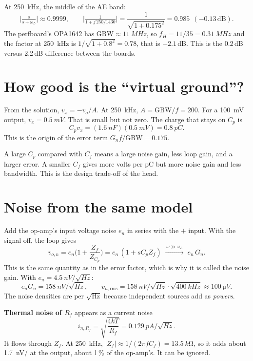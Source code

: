 \documentclass[11pt,a4paper]{article}
\begin{document}
At \SI{250}{kHz}, the middle of the AE band:
\[
\Big|\tfrac{s}{s+\omega_L}\Big|\approx 0.9999,\qquad
\Big|\tfrac{1}{1+j\,250/1430}\Big|=\frac{1}{\sqrt{1+0.175^2}}=0.985\ \ (-0.13\,\mathrm{dB}).
\]
The perfboard's OPA1642 has $\mathrm{GBW}\approx\SI{11}{MHz}$, so $f_H=11/35=\SI{0.31}{MHz}$ and the factor at \SI{250}{kHz} is $1/\sqrt{1+0.8^2}=0.78$, that is $-2.1$\,dB. This is the 0.2\,dB versus 2.2\,dB difference between the boards.

\section{How good is the ``virtual ground''?}

From the solution, $v_x=-v_o/A$. At \SI{250}{kHz}, $A=\mathrm{GBW}/f=200$. For a \SI{100}{mV} output, $v_x=\SI{0.5}{mV}$. That is small but not zero. The charge that stays on $C_p$ is
\[
C_p v_x=(\SI{1.6}{nF})(\SI{0.5}{mV})=\SI{0.8}{pC}.
\]
This is the origin of the error term $G_n f/\mathrm{GBW}=0.175$.

\begin{key}
A large $C_p$ compared with $C_f$ means a large noise gain, less loop gain, and a larger error. A smaller $C_f$ gives more volts per pC but more noise gain and less bandwidth. This is the design trade-off of the head.
\end{key}

\section{Noise from the same model}

Add the op-amp's input voltage noise $e_n$ in series with the $+$ input. With the signal off, the loop gives
\[
v_{o,n}=e_n\Big(1+\frac{Z_f}{Z_{C_p}}\Big)=e_n\,(1+sC_pZ_f)\;\xrightarrow{\ \omega\gg\omega_L\ }\;e_n\,G_n .
\]
This is the same quantity as in the error factor, which is why it is called the noise gain. With $e_n=\SI{4.5}{nV/\sqrt{Hz}}$:
\[
e_nG_n=\SI{158}{nV/\sqrt{Hz}},\qquad
v_{n,\mathrm{rms}}=\SI{158}{nV/\sqrt{Hz}}\cdot\sqrt{\SI{400}{kHz}}\approx\SI{100}{\micro V}.
\]
The noise densities are per $\sqrt{\mathrm{Hz}}$ because independent sources add as \emph{powers}.

\textbf{Thermal noise of $R_f$} appears as a current noise
\[
i_{n,R_f}=\sqrt{\frac{4kT}{R_f}}=\SI{0.129}{pA/\sqrt{Hz}} .
\]
It flows through $Z_f$. At \SI{250}{kHz}, $|Z_f|\approx 1/(2\pi fC_f)=\SI{13.5}{k\ohm}$, so it adds about \SI{1.7}{nV/} at the output, about 1\,\% of the op-amp's. It can be ignored.
\end{document}
